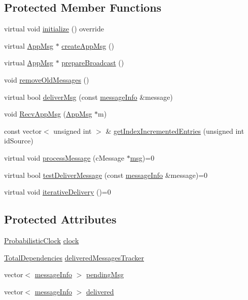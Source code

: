 \subsection*{Protected Member Functions}
\begin{DoxyCompactItemize}
\item 
virtual void \hyperlink{classNodeWithControl_a08c8e80fd67b52c51c642d7c66fe729c}{initialize} () override
\item 
virtual \hyperlink{classAppMsg}{App\+Msg} $\ast$ \hyperlink{classNodeWithControl_a7772568c2836f5f204952ebe659e0049}{create\+App\+Msg} ()
\item 
virtual \hyperlink{classAppMsg}{App\+Msg} $\ast$ \hyperlink{classNodeWithControl_ab871014cf3f42d834f8d34ad5498174c}{prepare\+Broadcast} ()
\item 
void \hyperlink{classNodeWithControl_add681efe156d989a717d2cd979f5ac9f}{remove\+Old\+Messages} ()
\item 
virtual bool \hyperlink{classNodeWithControl_aada7451be61be592b27188b6249afef2}{deliver\+Msg} (const \hyperlink{structures_8h_a7e7bdc1d2fff8a9436f2f352b2711ed6}{message\+Info} \&message)
\item 
void \hyperlink{classNodeWithControl_ae177f5f64edcc09a3875e5afdc82edd2}{Recv\+App\+Msg} (\hyperlink{classAppMsg}{App\+Msg} $\ast$m)
\item 
const vector$<$ unsigned int $>$ \& \hyperlink{classNodeWithControl_acf1daba46cfa16eb2bd7cbd399c2624b}{get\+Index\+Incremented\+Entries} (unsigned int id\+Source)
\item 
virtual void \hyperlink{classNodeWithControl_af532082fab76c38d8c50ca90e991f4c3}{process\+Message} (c\+Message $\ast$\hyperlink{Controller_8h_afa0f3b802fbc219228f7bb97996fa558}{msg})=0
\item 
virtual bool \hyperlink{classNodeWithControl_a84df0beabbaed80e7da017d592480515}{test\+Deliver\+Message} (const \hyperlink{structures_8h_a7e7bdc1d2fff8a9436f2f352b2711ed6}{message\+Info} \&message)=0
\item 
virtual void \hyperlink{classNodeWithControl_a4f78078272b90937e0746c797443b37d}{iterative\+Delivery} ()=0
\end{DoxyCompactItemize}
\subsection*{Protected Attributes}
\begin{DoxyCompactItemize}
\item 
\hyperlink{classProbabilisticClock}{Probabilistic\+Clock} \hyperlink{classNodeWithControl_a051a7d7f2452f1f8da3bc5bfb05a7760}{clock}
\item 
\hyperlink{classTotalDependencies}{Total\+Dependencies} \hyperlink{classNodeWithControl_a6c868fa52cca68f650dca96a788475df}{delivered\+Messages\+Tracker}
\item 
vector$<$ \hyperlink{structures_8h_a7e7bdc1d2fff8a9436f2f352b2711ed6}{message\+Info} $>$ \hyperlink{classNodeWithControl_af38ffbedc82038536c77314f22ea6b57}{pending\+Msg}
\item 
vector$<$ \hyperlink{structures_8h_a7e7bdc1d2fff8a9436f2f352b2711ed6}{message\+Info} $>$ \hyperlink{classNodeWithControl_aed34cc5a5b277c43f10f8cbbbeb59327}{delivered}
\end{DoxyCompactItemize}
